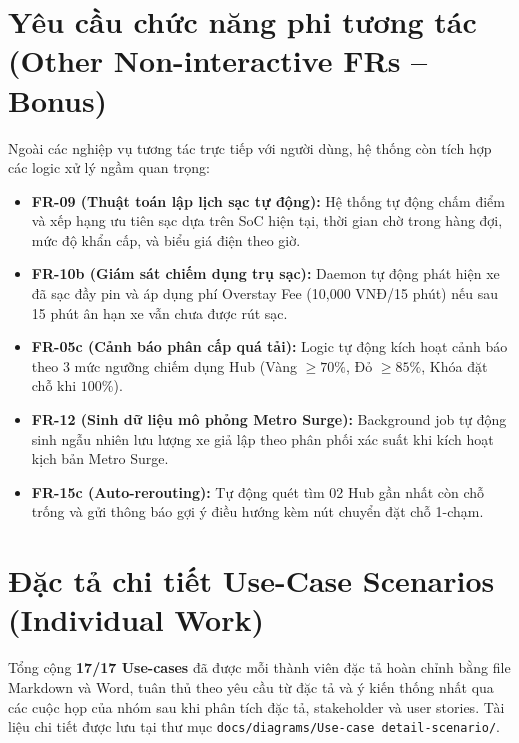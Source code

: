 \documentclass[12pt,a4paper]{report}
\begin{document}
\section{Yêu cầu chức năng phi tương tác (Other Non-interactive FRs -- Bonus)}

Ngoài các nghiệp vụ tương tác trực tiếp với người dùng, hệ thống còn tích hợp các logic xử lý ngầm quan trọng:
\begin{itemize}[nosep]
    \item \textbf{FR-09 (Thuật toán lập lịch sạc tự động):} Hệ thống tự động chấm điểm và xếp hạng ưu tiên sạc dựa trên SoC hiện tại, thời gian chờ trong hàng đợi, mức độ khẩn cấp, và biểu giá điện theo giờ.
    \item \textbf{FR-10b (Giám sát chiếm dụng trụ sạc):} Daemon tự động phát hiện xe đã sạc đầy pin và áp dụng phí Overstay Fee (10,000 VNĐ/15 phút) nếu sau 15 phút ân hạn xe vẫn chưa được rút sạc.
    \item \textbf{FR-05c (Cảnh báo phân cấp quá tải):} Logic tự động kích hoạt cảnh báo theo 3 mức ngưỡng chiếm dụng Hub (Vàng $\ge 70\%$, Đỏ $\ge 85\%$, Khóa đặt chỗ khi $100\%$).
    \item \textbf{FR-12 (Sinh dữ liệu mô phỏng Metro Surge):} Background job tự động sinh ngẫu nhiên lưu lượng xe giả lập theo phân phối xác suất khi kích hoạt kịch bản Metro Surge.
    \item \textbf{FR-15c (Auto-rerouting):} Tự động quét tìm 02 Hub gần nhất còn chỗ trống và gửi thông báo gợi ý điều hướng kèm nút chuyển đặt chỗ 1-chạm.
\end{itemize}

\section{Đặc tả chi tiết Use-Case Scenarios (Individual Work)}

Tổng cộng \textbf{17/17 Use-cases} đã được mỗi thành viên đặc tả hoàn chỉnh bằng file Markdown và Word, tuân thủ theo yêu cầu từ đặc tả và ý kiến thống nhất qua các cuộc họp của nhóm sau khi phân tích đặc tả, stakeholder và user stories. Tài liệu chi tiết được lưu tại thư mục \texttt{docs/diagrams/Use-case detail-scenario/}.
\end{document}
